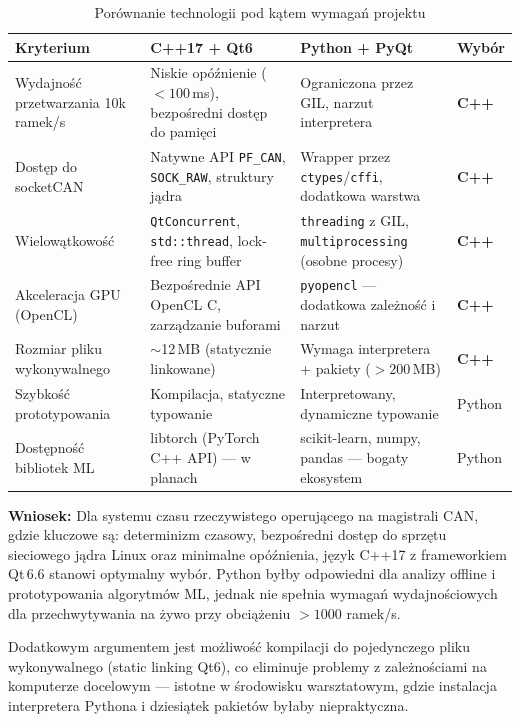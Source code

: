 \documentclass[12pt, a4paper]{article}
\begin{document}
\begin{table}[H]
\caption{Porównanie technologii pod kątem wymagań projektu}
\label{tab:techchoice}
\centering
\small
\begin{tabular}{p{3.5cm}p{4.0cm}p{4.0cm}p{2.5cm}}
\toprule
\textbf{Kryterium} & \textbf{C++17 + Qt6} & \textbf{Python + PyQt} & \textbf{Wybór} \\
\midrule
Wydajność przetwarzania 10k ramek/s &
  Niskie opóźnienie ($<100$\,ms), bezpośredni dostęp do pamięci &
  Ograniczona przez GIL, narzut interpretera &
  \textbf{C++} \\
\rowcolor{blue!3}
Dostęp do socketCAN &
  Natywne API \texttt{PF\_CAN}, \texttt{SOCK\_RAW}, struktury jądra &
  Wrapper przez \texttt{ctypes}/\texttt{cffi}, dodatkowa warstwa &
  \textbf{C++} \\
Wielowątkowość &
  \texttt{QtConcurrent}, \texttt{std::thread}, lock-free ring buffer &
  \texttt{threading} z GIL, \texttt{multiprocessing} (osobne procesy) &
  \textbf{C++} \\
Akceleracja GPU (OpenCL) &
  Bezpośrednie API OpenCL C, zarządzanie buforami &
  \texttt{pyopencl} --- dodatkowa zależność i narzut &
  \textbf{C++} \\
\rowcolor{blue!3}
Rozmiar pliku wykonywalnego &
  $\sim$12\,MB (statycznie linkowane) &
  Wymaga interpretera + pakiety ($>200$\,MB) &
  \textbf{C++} \\
Szybkość prototypowania &
  Kompilacja, statyczne typowanie &
  Interpretowany, dynamiczne typowanie &
  Python \\
\rowcolor{blue!3}
Dostępność bibliotek ML &
  libtorch (PyTorch C++ API) --- w planach &
  scikit-learn, numpy, pandas --- bogaty ekosystem &
  Python \\
\bottomrule
\end{tabular}
\end{table}

\textbf{Wniosek:} Dla systemu czasu rzeczywistego operującego na magistrali CAN,
gdzie kluczowe są: determinizm czasowy, bezpośredni dostęp do sprzętu
sieciowego jądra Linux oraz minimalne opóźnienia, język C++17 z frameworkiem
Qt\,6.6 stanowi optymalny wybór. Python byłby odpowiedni dla analizy offline
i prototypowania algorytmów ML, jednak nie spełnia wymagań wydajnościowych
dla przechwytywania na żywo przy obciążeniu $>1000$ ramek/s.

Dodatkowym argumentem jest możliwość kompilacji do pojedynczego pliku
wykonywalnego (static linking Qt6), co eliminuje problemy z zależnościami
na komputerze docelowym --- istotne w środowisku warsztatowym, gdzie
instalacja interpretera Pythona i dziesiątek pakietów byłaby niepraktyczna.
\end{document}
